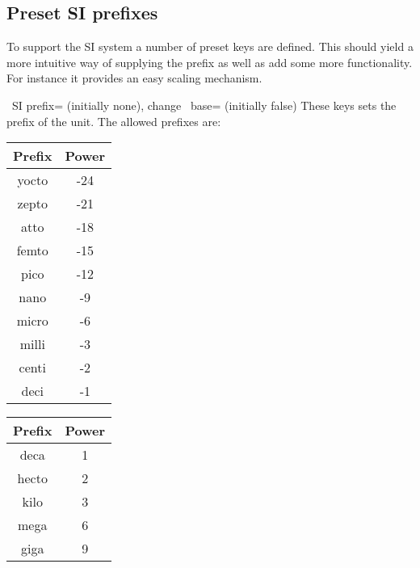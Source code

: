 \subsection{Preset SI prefixes}
\label{sec:SI:prefix}

To support the SI system a number of preset keys are defined. This should yield
a more intuitive way of supplying the prefix as well as add some more
functionality. For instance it provides an easy scaling mechanism.

\begin{pgfplotsxykeylist}{%
    \x\ SI prefix= (initially none),
    change \x\ base= (initially false)%
}
    These keys sets the prefix of the unit. The allowed prefixes are:
    \begin{center}
        \begin{tabular}{>{\ttfamily}cc}
                \toprule
            \textrm{Prefix} & Power \\
                \midrule
            yocto           & -24     \\
            zepto           & -21     \\
            atto            & -18     \\
            femto           & -15     \\
            pico            & -12     \\
            nano            & -9      \\
            micro           & -6      \\
            milli           & -3      \\
            centi           & -2      \\
            deci            & -1      \\
                \bottomrule
        \end{tabular}
            \qquad\qquad
        \begin{tabular}{>{\ttfamily}cc}
                \toprule
            \textrm{ Prefix} & Power \\
                \midrule
            deca             & 1     \\
            hecto            & 2     \\
            kilo             & 3     \\
            mega             & 6     \\
            giga             & 9     \\

\end{tabular}
\end{center}
\end{pgfplotsxykeylist}
